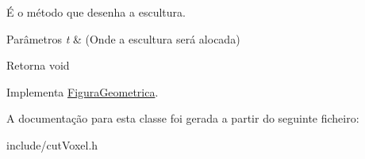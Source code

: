 É o método que desenha a escultura. 


\begin{DoxyParams}{Parâmetros}
{\em t} & (Onde a escultura será alocada) \\
\hline
\end{DoxyParams}
\begin{DoxyReturn}{Retorna}
void 
\end{DoxyReturn}


Implementa \hyperlink{class_figura_geometrica_a34585fd7c0bd7378fc69c4ee208e676c}{Figura\+Geometrica}.



A documentação para esta classe foi gerada a partir do seguinte ficheiro\+:\begin{DoxyCompactItemize}
\item 
include/cut\+Voxel.\+h\end{DoxyCompactItemize}
